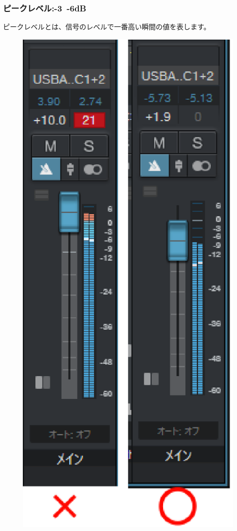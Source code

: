 \documentclass[11pt,a4paper]{jsarticle}
\begin{document}
            \subsubsection{ピークレベル:-3~-6dB}
                ピークレベルとは、信号のレベルで一番高い瞬間の値を表します。
                \begin{figure}[htbp]
                    \begin{center}
                    \includegraphics[width=12.0cm]{./format01.eps}
                    \label{fig:format01}
                    \end{center}
                \end{figure}
%
%
\end{document}

